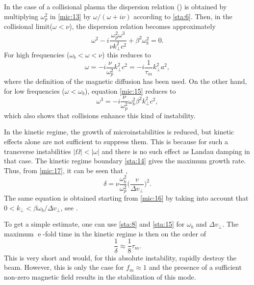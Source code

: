 \documentclass [12pt,a4paper,     ]{report} %
\newcommand{\e  }{\operatorname{e}}   %
\begin{document}
   In the case of a collisional plasma the dispersion relation (\cite[Eq.8]{MOLVI1975-}) is obtained by multiplying  $\omega_p^2$ in \eqref{mic:13} by $\omega/(\omega+i\nu)$ according to \eqref{sta:6}.  Then, in the collisional limit($\omega < \nu$), the dispersion relation becomes approximately \cite[Eq.75]{JORNA1978-}
%
\begin{equation}\label{mic:15} %
           \omega^2 - i \frac{\omega_p^2\omega^3}{\nu k_{\perp}^2c^2}
                    + \beta^2\omega_b^2 = 0.
\end{equation}
%
For high frequencies ($\omega_b < \omega < \nu$) this reduces to
%
\begin{equation}\label{mic:16} %
             \omega = -i \frac{\nu}{\omega_p^2} k_{\perp}^2 c^2
                    = -i \frac{1}{\tau_m} k_{\perp}^2 a^2,
\end{equation}
%
where the definition of the magnetic diffusion has been used.  On the other hand, for low frequencies ($\omega < \omega_b$), equation \eqref{mic:15} reduces to \cite{MOLVI1977-}
%
\begin{equation}\label{mic:17} %
      \omega^3 = -i \frac{\nu}{\omega_p^2}\omega_b^2\beta^2 k_{\perp}^2 c^2,
\end{equation}
%
which also shows that collisions enhance this kind of instability.

  In the kinetic regime, the growth of microinstabilities is reduced, but kinetic effects alone are not sufficient to suppress them.  This is because for such a transverse instabilities $|\Omega| < |\omega|$ and there is no such effect as Landau damping in that case.  The kinetic regime boundary \eqref{sta:14} gives the maximum growth rate.  Thus, from \eqref{mic:17}, it can be seen that \cite{IVANO1970-}, \cite[Eq.14]{MOLVI1975-}
%
\begin{equation}\label{mic:18} %
         \delta = \nu \frac{\omega_b^2}{\omega_p^2}
           \bigl( \frac{v}{\Delta v_{\perp}} \bigr)^2.
\end{equation}
%
The same equation is obtained starting from \eqref{mic:16} by taking into account that $0 < k_{\perp} < \beta \omega_b/\Delta v_{\perp}$, see \cite{HUBBA1978-}.

To get a simple estimate, one can use \eqref{sta:8} and \eqref{sta:15} for $\omega_b$ and $\Delta v_{\perp}$.  The maximum $\e$-fold time in the kinetic regime is then on the order of
%
\begin{equation}\label{mic:19} %
    \frac{1}{\delta} \approx \frac{1}{8} \tau_m.
\end{equation}
%
This is very short and would, for this absolute instability, rapidly destroy the beam.  However, this is only the case for $f_m\approx 1$ and the presence of a sufficient non-zero magnetic field results in the stabilization of this mode.
\end{document}
